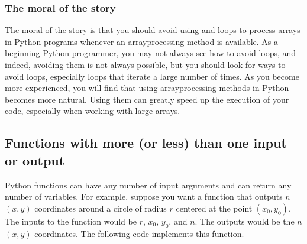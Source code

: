 \documentclass[letterpaper,10pt,english]{sphinxmanual}
\begin{document}
\subsubsection{The moral of the story}
\label{\detokenize{chap7/chap7_funcs:the-moral-of-the-story}}
\sphinxAtStartPar
The moral of the story is that you should avoid using  and  loops to process arrays in Python programs whenever an array\sphinxhyphen{}processing method is available.  As a beginning Python programmer, you may not always see how to avoid loops, and indeed, avoiding them is not always possible, but you should look for ways to avoid loops, especially loops that iterate a large number of times. As you become more experienced, you will find that using array\sphinxhyphen{}processing methods in Python becomes more natural. Using them can greatly speed up the execution of your code, especially when working with large arrays.


\subsection{Functions with more (or less) than one input or output}
\label{\detokenize{chap7/chap7_funcs:functions-with-more-or-less-than-one-input-or-output}}
\sphinxAtStartPar
Python functions can have any number of input arguments and can return any number of variables.  For example, suppose you want a function that outputs \(n\) \((x,y)\) coordinates around a circle of radius \(r\) centered at the point \((x_0,y_0)\).  The inputs to the function would be  \(r\), \(x_0\), \(y_0\), and  \(n\).  The outputs would be the \(n\) \((x,y)\) coordinates.  The following code implements this function.

\begin{sphinxVerbatim}[commandchars=\\\{\},numbers=left,firstnumber=1,stepnumber=1]
    
         
        
        
      
\end{sphinxVerbatim}
\end{document}
